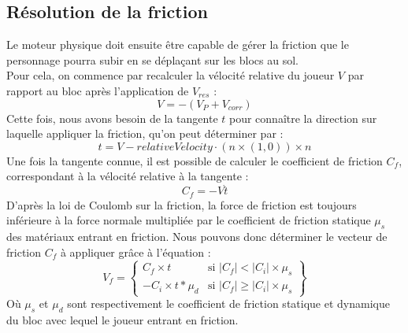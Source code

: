 \documentclass[10pt]{report}
\begin{document}
\subsection{Résolution de la friction}
Le moteur physique doit ensuite être capable de gérer la friction que le personnage pourra subir en se déplaçant sur les blocs au sol.\\
Pour cela, on commence par recalculer la vélocité relative du joueur \(V\) par rapport au bloc après l'application de \(V_{res}\) :
\[V =  - (V_{P} + V_{corr})\]
Cette fois, nous avons besoin de la tangente \(t\) pour connaître la direction sur laquelle appliquer la friction, qu'on peut déterminer par :
\[t = V - relativeVelocity \cdot (n \times (1,0)) \times n\]
Une fois la tangente connue, il est possible de calculer le coefficient de friction \(C_{f}\), correspondant à la vélocité relative à la tangente :
\[C_{f} = - V \dot t\]
D'après la loi de Coulomb sur la friction, la force de friction est toujours inférieure à la force normale multipliée par le coefficient de friction statique \(\mu_{s}\) des matériaux entrant en friction. Nous pouvons donc déterminer le vecteur de friction \(C_{f}\) à appliquer grâce à l'équation :
\[
V_{f} = \left\{\begin{array}{lr}
           C_{f} \times t & \text{si } |C_{f}| < |C_{i}| \times \mu_{s}\\
          -C_{i} \times t * \mu_{d} & \text{si } |C_{f}| \geq |C_{i}| \times \mu_{s}
        \end{array}\right\}
\]
Où \(\mu_{s}\) et \(\mu_{d}\) sont respectivement le coefficient de friction statique et dynamique du bloc avec lequel le joueur entrant en friction.
\end{document}
